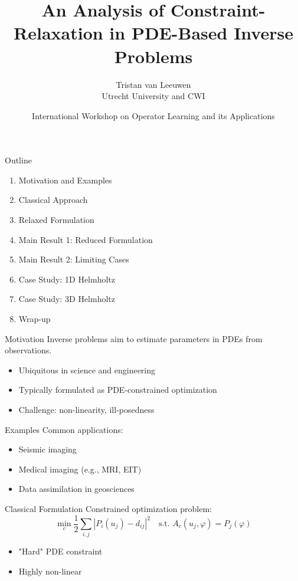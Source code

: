 \documentclass{beamer}
\title[Constraint-Relaxation in PDE Inverse Problems]{An Analysis of Constraint-Relaxation in PDE-Based Inverse Problems}
\author{Tristan van Leeuwen \\ Utrecht University and CWI}
\date{International Workshop on Operator Learning and its Applications}
\begin{document}
\begin{frame}
  \titlepage
\end{frame}

\begin{frame}{Outline}
\begin{enumerate}
  \item Motivation and Examples
  \item Classical Approach
  \item Relaxed Formulation
  \item Main Result 1: Reduced Formulation
  \item Main Result 2: Limiting Cases
  \item Case Study: 1D Helmholtz
  \item Case Study: 3D Helmholtz
  \item Wrap-up
\end{enumerate}
\end{frame}

\begin{frame}{Motivation}
Inverse problems aim to estimate parameters in PDEs from observations.
\begin{itemize}
  \item Ubiquitous in science and engineering
  \item Typically formulated as PDE-constrained optimization
  \item Challenge: non-linearity, ill-posedness
\end{itemize}
\end{frame}

\begin{frame}{Examples}
Common applications:
\begin{itemize}
  \item Seismic imaging
  \item Medical imaging (e.g., MRI, EIT)
  \item Data assimilation in geosciences
\end{itemize}
\end{frame}

\begin{frame}{Classical Formulation}
Constrained optimization problem:
\begin{equation*}
\min_c \frac{1}{2} \sum_{i,j} |P_i(u_j) - d_{ij}|^2 \quad \text{s.t. } A_c(u_j, \varphi) = P_j(\varphi)
\end{equation*}
\begin{itemize}
  \item "Hard" PDE constraint
  \item Highly non-linear
\end{itemize}
\end{frame}
\end{document}
